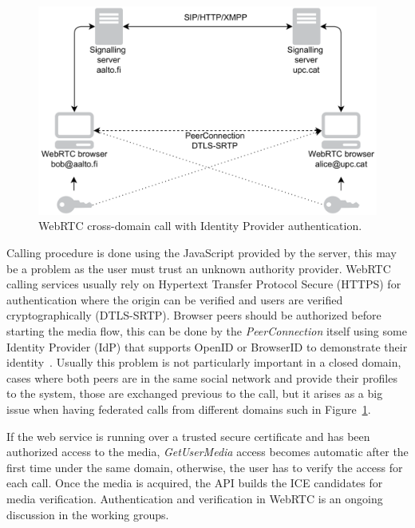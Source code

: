  \begin{figure}[h]
  \centering
    \includegraphics[width=1\textwidth]{./figures/idpWebRTCcall.pdf}
      \caption[WebRTC cross-domain call with Identity Provider authentication]{WebRTC cross-domain call with Identity Provider authentication.}
	\label{fig:idpWebRTCcall}
\end{figure}

Calling procedure is done using the JavaScript provided by the server, this may be a problem as the user must trust an unknown authority provider. WebRTC calling services usually rely on Hypertext Transfer Protocol Secure (HTTPS)  for authentication where the origin can be verified and users are verified cryptographically (DTLS-SRTP). Browser peers should be authorized before starting the media flow, this can be done by the {\it PeerConnection} itself using some Identity Provider (IdP) that supports OpenID or BrowserID to demonstrate their identity~\cite{rtcwebSecurityArchIETF}. Usually this problem is not particularly important in a closed domain, cases where both peers are in the same social network and provide their profiles to the system, those are exchanged previous to the call, but it arises as a big issue when having federated calls from different domains such in Figure~\ref{fig:idpWebRTCcall}.

If the web service is running over a trusted secure certificate and has been authorized access to the media, {\it GetUserMedia} access becomes automatic after the first time under the same domain, otherwise, the user has to verify the access for each call. Once the media is acquired, the API builds the ICE candidates for media verification. Authentication and verification in WebRTC is an ongoing discussion in the working groups.

